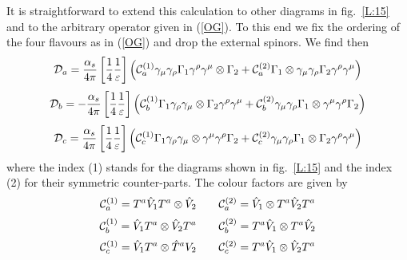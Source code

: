 \documentclass[12pt,rotate]{article}
\def\as{\alpha_s}
\newcommand{\be}{\begin{equation}}
\newcommand{\ee}{\end{equation}}
\begin{document}
\begin{itemize}
\begin{itemize}
\begin{itemize}
It is straightforward to extend this calculation to other diagrams
in fig.~\ref{L:15} and to the arbitrary operator given in (\ref{OG}).
To this end we fix the ordering of the four flavours as in (\ref{OG})
and drop the external spinors. We find then
\be\label{DA}
{\cal D}_a=\frac{\as}{4\pi}
\left[\frac{1}{4}\frac{1}{\varepsilon}\right]
\left({\cal C}_a^{(1)}
\gamma_\mu\gamma_\rho\Gamma_1\gamma^\rho\gamma^\mu \otimes \Gamma_2
+{\cal C}_a^{(2)}
\Gamma_1\otimes\gamma_\mu\gamma_\rho\Gamma_2\gamma^\rho\gamma^\mu 
\right)
\ee
\be\label{DB}
{\cal D}_b=-\frac{\as}{4\pi}
\left[\frac{1}{4}\frac{1}{\varepsilon}\right]
\left({\cal C}_b^{(1)}
\Gamma_1\gamma_\rho\gamma_\mu\otimes\Gamma_2\gamma^\rho\gamma^\mu 
+{\cal C}_b^{(2)}
\gamma_\mu\gamma_\rho\Gamma_1\otimes\gamma^\mu\gamma^\rho\Gamma_2 
\right)
\ee
\be\label{DC}
{\cal D}_c=\frac{\as}{4\pi}
\left[\frac{1}{4}\frac{1}{\varepsilon}\right]
\left({\cal C}_c^{(1)}
\Gamma_1\gamma_\rho\gamma_\mu\otimes\gamma^\mu\gamma^\rho\Gamma_2 
+{\cal C}_c^{(2)}
\gamma_\mu\gamma_\rho\Gamma_1\otimes\Gamma_2\gamma^\rho\gamma^\mu 
\right)
\ee
where the index (1) stands for the diagrams shown in fig.~\ref{L:15}
and the index (2) for their symmetric counter-parts.
The colour factors are given by 
\be\label{CA}
{\cal C}_a^{(1)}=T^a\hat V_1 T^a\otimes\hat V_2
\qquad 
{\cal C}_a^{(2)}=\hat V_1\otimes T^a\hat V_2 T^a
\ee
\be\label{CB}
{\cal C}_b^{(1)}=\hat V_1 T^a\otimes\hat V_2 T^a
\qquad 
{\cal C}_b^{(2)}=T^a\hat V_1\otimes T^a\hat V_2 
\ee
\be\label{CC}
{\cal C}_c^{(1)}=\hat V_1 T^a\otimes\hat T^a V_2 
\qquad 
{\cal C}_c^{(2)}=T^a\hat V_1\otimes \hat V_2 T^a 
\ee

\end{itemize}
\end{itemize}
\end{itemize}
\end{document}
